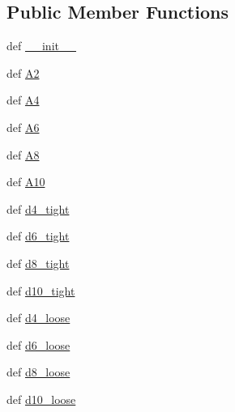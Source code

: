 \subsection*{Public Member Functions}
\begin{DoxyCompactItemize}
\item 
def \hyperlink{classscipy_1_1sparse_1_1linalg_1_1matfuncs_1_1__ExpmPadeHelper_ab402ab31fa3ca59bfffd2b8e261d3a5a}{\+\_\+\+\_\+init\+\_\+\+\_\+}
\item 
def \hyperlink{classscipy_1_1sparse_1_1linalg_1_1matfuncs_1_1__ExpmPadeHelper_a86e3470844e7742d6eeb39b2550f3e2f}{A2}
\item 
def \hyperlink{classscipy_1_1sparse_1_1linalg_1_1matfuncs_1_1__ExpmPadeHelper_a517e9b9421781522a8aa4a1e98c66ed8}{A4}
\item 
def \hyperlink{classscipy_1_1sparse_1_1linalg_1_1matfuncs_1_1__ExpmPadeHelper_af038964d08b1d8977fb5b30de6041888}{A6}
\item 
def \hyperlink{classscipy_1_1sparse_1_1linalg_1_1matfuncs_1_1__ExpmPadeHelper_aba5a45365ae4d651f36132858796eb24}{A8}
\item 
def \hyperlink{classscipy_1_1sparse_1_1linalg_1_1matfuncs_1_1__ExpmPadeHelper_a4a3067c9cc23e4ce979fc1bb306c04f3}{A10}
\item 
def \hyperlink{classscipy_1_1sparse_1_1linalg_1_1matfuncs_1_1__ExpmPadeHelper_a0d6e1d8f9e056a6df098b0c38a6bdf44}{d4\+\_\+tight}
\item 
def \hyperlink{classscipy_1_1sparse_1_1linalg_1_1matfuncs_1_1__ExpmPadeHelper_a9d9c199578d5326a8a183b04930cfbb6}{d6\+\_\+tight}
\item 
def \hyperlink{classscipy_1_1sparse_1_1linalg_1_1matfuncs_1_1__ExpmPadeHelper_a53d5695ad8d7f183535d809112bbc5fd}{d8\+\_\+tight}
\item 
def \hyperlink{classscipy_1_1sparse_1_1linalg_1_1matfuncs_1_1__ExpmPadeHelper_a89c2029555602947100cd35c8c1a0f2c}{d10\+\_\+tight}
\item 
def \hyperlink{classscipy_1_1sparse_1_1linalg_1_1matfuncs_1_1__ExpmPadeHelper_ad34e83d4e389d428d0880ee276bd9af7}{d4\+\_\+loose}
\item 
def \hyperlink{classscipy_1_1sparse_1_1linalg_1_1matfuncs_1_1__ExpmPadeHelper_afd667289d37aafe7f9365278ce2a292d}{d6\+\_\+loose}
\item 
def \hyperlink{classscipy_1_1sparse_1_1linalg_1_1matfuncs_1_1__ExpmPadeHelper_a37c232e7d32d3f91cd94f706e8cdfec2}{d8\+\_\+loose}
\item 
def \hyperlink{classscipy_1_1sparse_1_1linalg_1_1matfuncs_1_1__ExpmPadeHelper_a72f785ac272887bffc67a5dfeb80c11f}{d10\+\_\+loose}

\end{DoxyCompactItemize}

